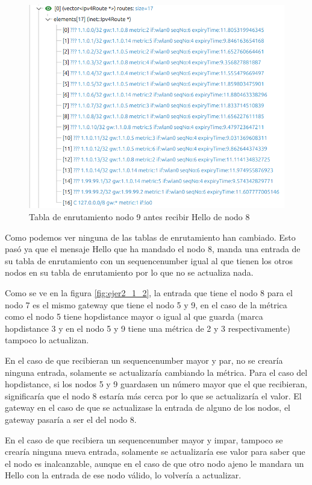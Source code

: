 \begin{figure}[H]
    \centering
    \includegraphics[width=115mm, scale=0.75]{imaxes/dsdv/ejercicio2_4_1_nodo9.png}
    \caption{Tabla de enrutamiento nodo 9 antes recibir Hello de nodo 8}
    \label{fig:ejer2_4_4}
\end{figure}


Como podemos ver ninguna de las tablas de enrutamiento han cambiado. Esto pasó ya que el mensaje Hello que ha mandado el nodo 8, manda una entrada de su tabla de enrutamiento con un sequencenumber igual al que tienen los otros nodos en su tabla de enrutamiento por lo que no se actualiza nada.

Como se ve en la figura \ref{fig:ejer2_1_2}, la entrada que tiene el nodo 8 para el nodo 7 es el mismo gateway que tiene el nodo 5 y 9, en el caso de la métrica como el nodo 5 tiene hopdistance mayor o igual al que guarda (marca hopdistance 3 y en el nodo 5 y 9 tiene una métrica de 2 y 3 respectivamente) tampoco lo actualizan. 

En el caso de que recibieran un sequencenumber mayor y par, no se crearía ninguna entrada, solamente se actualizaría cambiando la métrica. Para el caso del hopdistance, si los nodos 5 y 9 guardasen un número mayor que el que recibieran, significaría que el nodo 8 estaría más cerca por lo que se actualizaría el valor. El gateway en el caso de que se actualizase la entrada de alguno de los nodos, el gateway pasaría a ser el del nodo 8.

En el caso de que recibiera un sequencenumber mayor y impar, tampoco se crearía ninguna nueva entrada, solamente se actualizaría ese valor para saber que el nodo es inalcanzable, aunque en el caso de que otro nodo ajeno le mandara un Hello con la entrada de ese nodo válido, lo volvería a actualizar.


